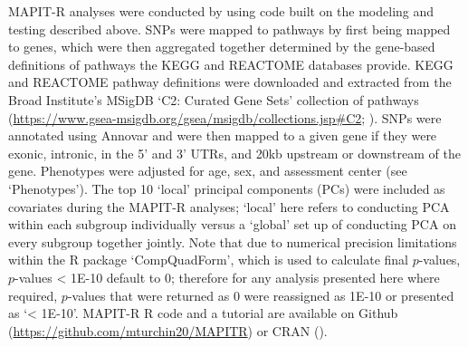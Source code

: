 \documentclass[10pt,a4paper]{article}
\begin{document}
MAPIT-R analyses were conducted by using code built on the modeling and testing described above. SNPs were mapped to pathways by first being mapped to genes, which were then aggregated together determined by the gene-based definitions of pathways the KEGG and REACTOME databases provide. KEGG and REACTOME pathway definitions were downloaded and extracted from the Broad Institute's MSigDB `C2: Curated Gene Sets' collection of pathways (\url{https://www.gsea-msigdb.org/gsea/msigdb/collections.jsp#C2}; \citep{Liberzon2011}). SNPs were annotated using Annovar \citep{Wang2010a} and were then mapped to a given gene if they were exonic, intronic, in the 5' and 3' UTRs, and 20kb upstream or downstream of the gene. Phenotypes were adjusted for age, sex, and assessment center (see `Phenotypes'). The top 10 `local' principal components (PCs) were included as covariates during the MAPIT-R analyses; `local' here refers to conducting PCA within each subgroup individually versus a `global' set up of conducting PCA on every subgroup together jointly. Note that due to numerical precision limitations within the R package `CompQuadForm', which is used to calculate final $p$-values, $p$-values < 1E-10 default to 0; therefore for any analysis presented here where required, $p$-values that were returned as 0 were reassigned as 1E-10 or presented as `< 1E-10'. MAPIT-R R code and a tutorial are available on Github (\url{https://github.com/mturchin20/MAPITR}) or CRAN (\url{}).



\fi
\end{document}
